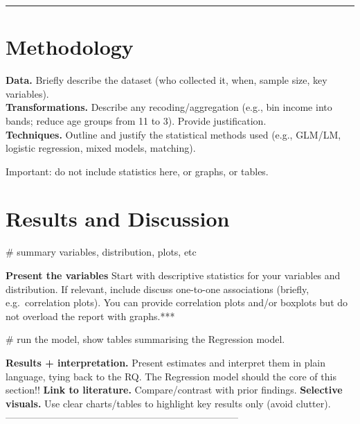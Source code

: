 \documentclass[
  letterpaper,
  DIV=11,
  numbers=noendperiod]{scrreprt}
\newenvironment{Shaded}{\begin{snugshade}}{\end{snugshade}}
\newcommand{\CommentTok}[1]{\textcolor[rgb]{0.37,0.37,0.37}{#1}}
\begin{document}
\begin{center}\rule{0.5\linewidth}{0.5pt}\end{center}

\section*{Methodology}\label{methodology}


\textbf{Data.} Briefly describe the dataset (who collected it, when,
sample size, key variables).\\
\textbf{Transformations.} Describe any recoding/aggregation (e.g., bin
income into bands; reduce age groups from 11 to 3). Provide
justification.\\
\textbf{Techniques.} Outline and justify the statistical methods used
(e.g., GLM/LM, logistic regression, mixed models, matching).

Important: do not include statistics here, or graphs, or tables.

\section*{Results and Discussion}\label{results-and-discussion}


\begin{Shaded}
\begin{Highlighting}[]
\CommentTok{\# summary variables, distribution, plots, etc}
\end{Highlighting}
\end{Shaded}

\textbf{Present the variables} Start with descriptive statistics for
your variables and distribution. If relevant, include discuss one-to-one
associations (briefly, e.g.~correlation plots). You can provide
correlation plots and/or boxplots but do not overload the report with
graphs.***

\begin{Shaded}
\begin{Highlighting}[]
\CommentTok{\# run the model, show tables summarising the Regression model.}
\end{Highlighting}
\end{Shaded}

\textbf{Results + interpretation.} Present estimates and interpret them
in plain language, tying back to the RQ. The Regression model should the
core of this section!! \textbf{Link to literature.} Compare/contrast
with prior findings. \textbf{Selective visuals.} Use clear charts/tables
to highlight key results only (avoid clutter).
------------------------------------------------------------------------
\end{document}
